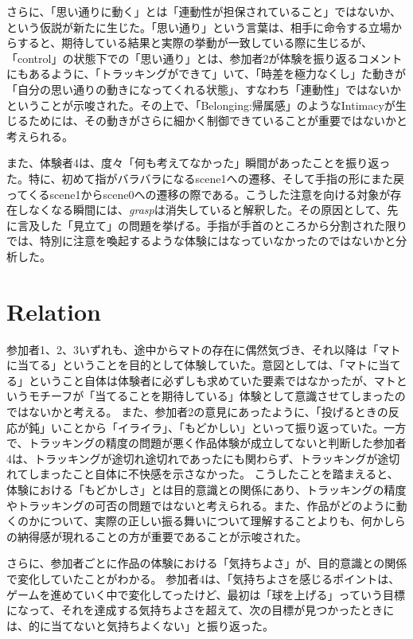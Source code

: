 さらに、「思い通りに動く」とは「連動性が担保されていること」ではないか、という仮説が新たに生じた。「思い通り」という言葉は、相手に命令する立場からすると、期待している結果と実際の挙動が一致している際に生じるが、「control」の状態下での「思い通り」とは、参加者2が体験を振り返るコメントにもあるように、「トラッキングができて」いて、「時差を極力なくし」た動きが「自分の思い通りの動きになってくれる状態」、すなわち「連動性」ではないかということが示唆された。その上で、「Belonging:帰属感」のようなIntimacyが生じるためには、その動きがさらに細かく制御できていることが重要ではないかと考えられる。

また、体験者4は、度々「何も考えてなかった」瞬間があったことを振り返った。特に、初めて指がバラバラになるscene1への遷移、そして手指の形にまた戻ってくるscene1からscene0への遷移の際である。こうした注意を向ける対象が存在しなくなる瞬間には、\textit{grasp}は消失していると解釈した。その原因として、先に言及した「見立て」の問題を挙げる。手指が手首のところから分割された限りでは、特別に注意を喚起するような体験にはなっていなかったのではないかと分析した。

\section{Relation}
参加者1、2、3いずれも、途中からマトの存在に偶然気づき、それ以降は「マトに当てる」ということを目的として体験していた。意図としては、「マトに当てる」ということ自体は体験者に必ずしも求めていた要素ではなかったが、マトというモチーフが「当てることを期待している」体験として意識させてしまったのではないかと考える。
また、参加者2の意見にあったように、「投げるときの反応が鈍」いことから「イライラ」、「もどかしい」といって振り返っていた。一方で、トラッキングの精度の問題が悪く作品体験が成立してないと判断した参加者4は、トラッキングが途切れ途切れであったにも関わらず、トラッキングが途切れてしまったこと自体に不快感を示さなかった。
こうしたことを踏まえると、体験における「もどかしさ」とは目的意識との関係にあり、トラッキングの精度やトラッキングの可否の問題ではないと考えられる。また、作品がどのように動くのかについて、実際の正しい振る舞いについて理解することよりも、何かしらの納得感が現れることの方が重要であることが示唆された。

さらに、参加者ごとに作品の体験における「気持ちよさ」が、目的意識との関係で変化していたことがわかる。
参加者4は、「気持ちよさを感じるポイントは、ゲームを進めていく中で変化してったけど、最初は「球を上げる」っていう目標になって、それを達成する気持ちよさを超えて、次の目標が見つかったときには、的に当てないと気持ちよくない」と振り返った。


